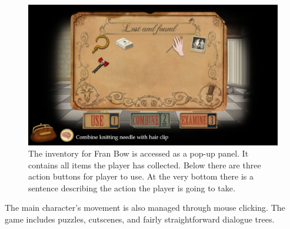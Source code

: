 \begin{figure}[H]
\centering
\includegraphics[width=1.\linewidth]{img/Fran_Bow.png}
\caption{The inventory for Fran Bow is accessed as a pop-up panel. It contains all items the player has collected. Below there are three action buttons for player to use. At the very bottom there is a sentence describing the action the player is going to take.}
\label{fig:FranBow}
\end{figure}

The main character's movement is also managed through mouse clicking. The game includes puzzles, cutscenes, and fairly straightforward dialogue trees.